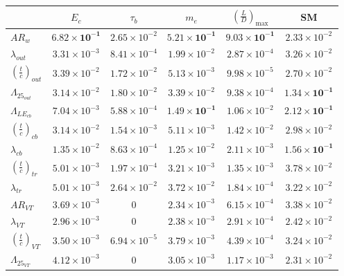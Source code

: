 \begin{table}[!h]
	\centering
	\begin{tabular}{l c c c c c}
		\hline
		& $E_{c}$ & $\tau_{b}$ & $m_e$ & $\left(\frac{L}{D}\right)_{\max}$ & SM \\
		\hline
		$AR_w$ & $\mathbf{6.82\times10^{-1}}$ & $2.65\times10^{-2}$ & $\mathbf{5.21\times10^{-1}}$ & $\mathbf{9.03\times10^{-1}}$ & $2.33\times10^{-2}$ \\
		$\lambda_{out}$ & $3.31\times10^{-3}$ & $8.41\times10^{-4}$ & $1.99\times10^{-2}$ & $2.87\times10^{-4}$ & $3.26\times10^{-2}$ \\
		$\left(\frac{t}{c}\right)_{out}$ & $3.39\times10^{-2}$ & $1.72\times10^{-2}$ & $5.13\times10^{-3}$ & $9.98\times10^{-5}$ & $2.70\times10^{-2}$ \\
		$\Lambda_{25_{out}}$ & $3.14\times10^{-2}$ & $1.80\times10^{-2}$ & $3.39\times10^{-2}$ & $9.38\times10^{-4}$ & $\mathbf{1.34\times10^{-1}}$ \\
		
		$\Lambda_{LE_{cb}}$ & $7.04\times10^{-3}$ & $5.88\times10^{-4}$ & $\mathbf{1.49\times10^{-1}}$ & $1.06\times10^{-2}$ & $\mathbf{2.12\times10^{-1}}$\\
		$\left(\frac{t}{c}\right)_{cb}$ & $3.14\times10^{-2}$ & $1.54\times10^{-3}$ & $5.11\times10^{-3}$ & $1.42\times10^{-2}$ & $2.98\times10^{-2}$\\
		$\lambda_{cb}$ & $1.35\times10^{-2}$ & $8.63\times10^{-4}$ & $1.25\times10^{-2}$ & $2.11\times10^{-3}$ & $\mathbf{1.56\times10^{-1}}$ \\
		$\left(\frac{t}{c}\right)_{tr}$ & $5.01\times10^{-3}$ & $1.97\times10^{-4}$ & $3.21\times10^{-3}$ & $1.35\times10^{-3}$ & $3.78\times10^{-2}$ \\
		$\lambda_{tr}$ & $5.01\times10^{-3}$ & $2.64\times10^{-2}$ & $3.72\times10^{-2}$ & $1.84\times10^{-4}$ & $3.22\times10^{-2}$ \\
		
		$AR_{VT}$ & $3.69\times10^{-3}$ & 0 & $2.34\times10^{-3}$ & $6.15\times10^{-4}$ & $3.38\times10^{-2}$ \\
		$\lambda_{VT}$ & $2.96\times10^{-3}$ & 0 & $2.38\times10^{-3}$ & $2.91\times10^{-4}$ & $2.42\times10^{-2}$ \\
		$\left(\frac{t}{c}\right)_{VT}$ & $3.50\times10^{-3}$ & $6.94\times10^{-5}$ & $3.79\times10^{-3}$ & $4.39\times10^{-4}$ & $3.24\times10^{-2}$ \\
		$\Lambda_{25_{VT}}$ & $4.12\times10^{-3}$ & 0 & $3.05\times10^{-3}$ & $1.17\times10^{-3}$ & $2.31\times10^{-2}$ \\
		

\end{tabular}
\end{table}
